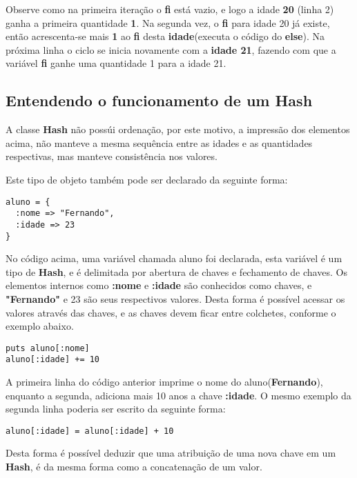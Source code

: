\documentclass[12pt]{article}
\newcommand{\code}[1] {\textbf{#1}}
\begin{document}
Observe como na primeira iteração o \code{fi} está vazio, e logo a idade \code{20} (linha 2) ganha a primeira quantidade \code{1}. Na segunda vez, o \code{fi} para idade 20 já existe, então acrescenta-se mais \code{1} ao \code{fi} desta \code{idade}(executa o código do \code{else}). Na próxima linha o ciclo se inicia novamente com a \textbf{idade 21}, fazendo com que a variável \code{fi} ganhe uma quantidade 1 para a idade 21.


\subsection { Entendendo o funcionamento de um Hash }

A classe \code{Hash} não possúi ordenação, por este motivo, a impressão dos elementos acima, não manteve a mesma sequência entre as idades e as quantidades respectivas, mas manteve consistência nos valores.

Este tipo de objeto também pode ser declarado da seguinte forma:

\begin{lstlisting}[caption=Sintaxe de declaração de um \code{Hash}]
aluno = { 
  :nome => "Fernando",
  :idade => 23
}
\end{lstlisting}

No código acima, uma variável chamada aluno foi declarada, esta variável é um tipo de \code{Hash}, e é delimitada por abertura de chaves e fechamento de chaves. Os elementos internos como \code{:nome} e \code{:idade} são conhecidos como chaves, e \code{"Fernando"} e 23 são seus respectivos valores. Desta forma é possível acessar os valores através das chaves, e as chaves devem ficar entre colchetes, conforme o exemplo abaixo. 


\begin{lstlisting}[caption=Usufruindo dos métodos do \code{Hash}]
puts aluno[:nome] 
aluno[:idade] += 10
\end{lstlisting}

A primeira linha do código anterior imprime o nome do aluno(\code{Fernando}), enquanto a segunda, adiciona mais 10 anos a chave \code{:idade}. O mesmo exemplo da segunda linha poderia ser escrito da seguinte forma:

\begin{lstlisting}[caption=Somando 10 anos a chave :idade]
aluno[:idade] = aluno[:idade] + 10
\end{lstlisting}

Desta forma é possível deduzir que uma atribuição de uma nova chave em um \code{Hash}, é da mesma forma como a concatenação de um valor.
\end{document}
